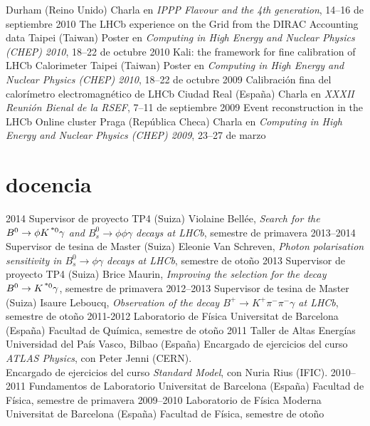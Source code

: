 {        {Durham (Reino Unido)}
        {Charla en \emph{IPPP Flavour and the 4th generation}, 14--16 de septiembre}
    \cventry
        {2010}
        {The LHCb experience on the Grid from the DIRAC Accounting data}
        {Taipei (Taiwan)}
        {Poster en \emph{Computing in High Energy and Nuclear Physics (CHEP) 2010}, 18--22 de octubre}
    \cventry
        {2010}
        {Kali: the framework for fine calibration of LHCb Calorimeter}
        {Taipei (Taiwan)}
        {Poster en \emph{Computing in High Energy and Nuclear Physics (CHEP) 2010}, 18--22 de octubre}
    \cventry
        {2009}
        {Calibraci\'{o}n fina del calor\'{i}metro electromagn\'{e}tico de LHCb}
        {Ciudad Real (España)}
        {Charla en \emph{XXXII Reuni\'{o}n Bienal de la RSEF}, 7--11 de septiembre}
    \cventry
        {2009}
        {Event reconstruction in the LHCb Online cluster}
        {Praga (República Checa)}
        {Charla en \emph{Computing in High Energy and Nuclear Physics (CHEP) 2009}, 23--27 de marzo}
}{}

{
\section{docencia}
    \cventry
        {2014}
        {Supervisor de proyecto TP4}
        {\epfl(Suiza)}
        {Violaine Bellée, \emph{Search for the $B^0\rightarrow \phi K^{\text{\,*}0}\gamma$ and $B_s^0\rightarrow \phi \phi\gamma$ decays at LHCb}, semestre de primavera}
    \cventry
        {2013--2014}
        {Supervisor de tesina de Master}
        {\epfl(Suiza)}
        {Eleonie Van Schreven, \emph{Photon polarisation sensitivity in $B^0_s\rightarrow \phi\gamma$ decays at LHCb}, semestre de otoño}
    \cventry
        {2013}
        {Supervisor de proyecto TP4}
        {\epfl(Suiza)}
        {Brice Maurin, \emph{Improving the selection for the decay $B^0\rightarrow K^{\text{\,*}0} \gamma$}, semestre de primavera}
    \cventry
        {2012--2013}
        {Supervisor de tesina de Master}
        {\epfl(Suiza)}
        {Isaure Leboucq, \emph{Observation of the decay $B^+\rightarrow K^+\pi^-\pi^-\gamma$ at LHCb}, semestre de otoño}
    \cventry
        {2011-2012}
        {Laboratorio de Física}
        {Universitat de Barcelona (España)}
        {Facultad de Química, semestre de otoño}
    \cventry
        {2011}
        {Taller de Altas Energ\'{i}as}
        {Universidad del País Vasco, Bilbao (España)}
        {Encargado de ejercicios del curso \emph{ATLAS Physics}, con Peter Jenni (CERN).\\
         Encargado de ejercicios del curso \emph{Standard Model}, con Nuria Rius (IFIC).}
    \cventry
        {2010--2011}
        {Fundamentos de Laboratorio}
        {Universitat de Barcelona (España)}
        {Facultad de Física, semestre de primavera}
    \cventry
        {2009--2010}
        {Laboratorio de Física Moderna}
        {Universitat de Barcelona (España)}
        {Facultad de Física, semestre de otoño}
}{}
    
